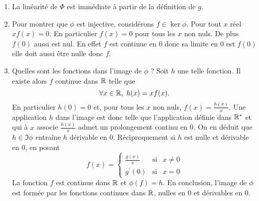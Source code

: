 \begin{enumerate}
 \item La linéarité de $\Phi$ est immédiate à partir de la définition de $g$.
 
 \item Pour montrer que $\phi $ est injective, considérons $f\in \ker \phi $. Pour tout $x$ r\'{e}el $xf(x)=0$. En particulier $f(x)=0$ pour tous les $x$ non nuls. De plus $f(0)$ aussi est nul. En effet $f$ est continue en $0$ donc sa limite en 0 est $f(0)$ elle doit aussi \^{e}tre nulle donc $f$.

 \item Quelles sont les fonctions dans l'image de $\phi $ ?\newline
Soit $h$ une telle fonction. Il existe alors $f$ continue dans $\mathbb{R}$ telle que 
\[
 \forall x \in\mathbb{R}, \; h(x) = xf(x).
\]
En particulier $h(0) = 0$ et, pour tous les $x$ non nuls, $f(x) = \frac{h(x)}{x}$. \newline
Une application $h$ dans l'image est donc telle que l'application d\'{e}finie dans $\mathbb{R}^{*}$ et qui \`{a} $x$ associe $\frac{h(x)}{x}$ admet un prolongement continu en 0. On en d\'{e}duit que $h\in \Im\phi $ entra\^{i}ne $h$ dérivable en 0.\newline
Réciproquement si $h$ est nulle et dérivable en $0$, en posant
\[
f(x) = \left\{
\begin{array}{ccc}
\frac{g(x)}{x} & \text{si} & x\neq 0 \\
g^{\prime }(0) & \text{si} & x=0
\end{array}
\right.
\]
La fonction $f$ est continue dans $\mathbb{R}$ et $\phi (f) = h$.\newline
En conclusion, l'image de $\phi $ est form\'{e}e par les fonctions continues dans $\mathbb{R}$, nulles en 0 et dérivables en 0.
\end{enumerate}
